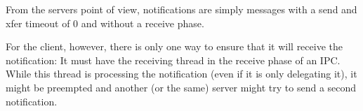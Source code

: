 From the servers point of view, notifications are simply messages with
a send and xfer timeout of 0 and without a receive phase.

For the client, however, there is only one way to ensure that it will
receive the notification: It must have the receiving thread in the
receive phase of an IPC.  While this thread is processing the
notification (even if it is only delegating it), it might be preempted
and another (or the same) server might try to send a second
notification.

\begin{comment}
  It is an open challenge how the client can ensure that it either
  receives the notification or at least knows that it missed it, while
  the server remains save from potential DoS attacks.  The usual
  strategy, to give receivers of notifications a higher scheduling
  priority than the sender, is not usable in a system with untrusted
  receivers (like the Hurd).  The best strategy determined so far is
  to have the servers retry to send the notification several times
  with small delays inbetween.  This can increase the chance that a
  client is able to receive the notification.  However, there is still
  the question what a server can do if the client is not ready.
 
  An alternative might be a global trusted notification server that
  runs at a higher scheduling priority and records which servers have
  notifications for which clients, and that can be used by clients to
  be notified of pending notifications.  Then the clients can poll the
  notifications from the servers.
\end{comment}


